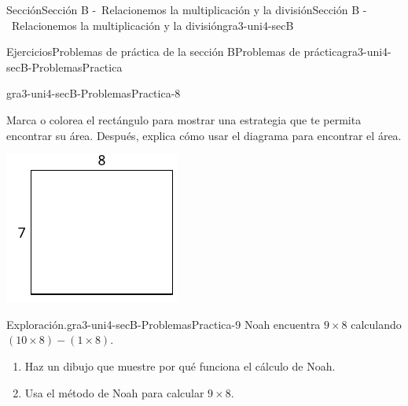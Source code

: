 \documentclass[twoside,10pt,]{article}
\begin{document}
\begin{sectionptx}{Sección}{Sección B -~Relacionemos la multiplicación y la división}{}{Sección B -~Relacionemos la multiplicación y la división}{}{}{gra3-uni4-secB}
\begin{exercises-subsection}{Ejercicios}{Problemas de práctica de la sección B}{}{Problemas de práctica}{}{}{gra3-uni4-secB-ProblemasPractica}
\begin{divisionexercise}{6}{}{}{gra3-uni4-secB-ProblemasPractica-8}%
\begin{sidebyside}{2}{0}{0}{0}%
\begin{sbspanel}{0.6}%
Marca o colorea el rectángulo para mostrar una estrategia que te permita encontrar su área. Después, explica cómo usar el diagrama para encontrar el área.%
\end{sbspanel}%
\begin{sbspanel}{0.4}%
\includegraphics[width=\linewidth]{external/svg-source/tikz-file-159147.pdf}
\end{sbspanel}%
\end{sidebyside}%
\end{divisionexercise}%
\begin{divisionexercise}{7}{Exploración.}{}{gra3-uni4-secB-ProblemasPractica-9}%
Noah encuentra \(9 \times 8\) calculando \((10 \times 8) - (1 \times 8)\).%
%
\begin{enumerate}[label=(\alph*)]
\item{}Haz un dibujo que muestre por qué funciona el cálculo de Noah.%
\item{}Usa el método de Noah para calcular \(9\times 8\).%
\end{enumerate}
\end{divisionexercise}%
\end{exercises-subsection}
%
%
\typeout{************************************************}

\end{sectionptx}
\end{document}
